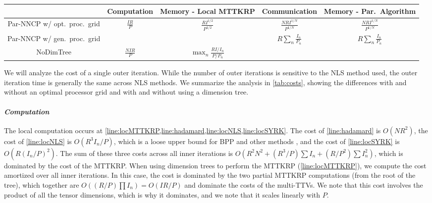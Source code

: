 \begin{table*}
\centering
\begin{tabular}{|c|cccc|}
\hline
 & \textbf{Computation} & \textbf{Memory - Local MTTKRP} & \textbf{Communication} & \textbf{Memory - Par.~Algorithm}  \\
\hline
Par-NNCP w/ opt.~proc.~grid & $\frac{IR}{P}$ & $\frac{RI^{1/2}}{P^{1/2}}$& $\frac{NRI^{1/N}}{P^{1/N}}$ & $\frac{NRI^{1/N}}{P^{1/N}}$  \\
Par-NNCP w/ gen.~proc.~grid & & & $R\sum_n \frac{I_n}{P_n}$ & $R\sum_n \frac{I_n}{P_n}$  \\
NoDimTree & $\frac{NIR}{P}$ & $\displaystyle \max_n \frac{RI/I_n}{P/P_n}$  &  & \\
\hline
\end{tabular}
\smallskip
\caption{Leading-order per-iteration costs in terms of computation (flops), communication (words moved), and memory (words).  We ignore constants but omit big-Oh notation for clarity.  The first line corresponds to \cref{alg:Par-NNCP-short} with an optimal choice of processor grid and applying the dimension tree optimization locally.  The second line corresponds to the changes in communication and memory for a general processor grid.  The third line corresponds to the changes in computation and memory if the dimension tree optimization is not applied.}
\label{tab:costs}
\end{table*}

We will analyze the cost of a single outer iteration.
While the number of outer iterations is sensitive to the NLS method used, the outer iteration time is generally the same across NLS methods.
We summarize the analysis in \cref{tab:costs}, showing the differences with and without an optimal processor grid and with and without using a dimension tree.

\paragraph{\emph{Computation}}
The local computation occurs at \cref{line:locMTTKRP,line:hadamard,line:locNLS,line:locSYRK}.
The cost of \cref{line:hadamard} is $O(NR^2)$, the cost of \cref{line:locNLS} is $O(R^3I_n/P)$, which is a loose upper bound for BPP and other methods \cite{KBP16}, and the cost of \cref{line:locSYRK} is $O(R(I_n/P)^2)$.
The sum of these three costs across all inner iterations is $O(R^2N^2+(R^3/P)\sum I_n+(R/P^2)\sum I_n^2)$, which is dominated by the cost of the MTTKRP.
When using dimension trees to perform the MTTKRP (\cref{line:locMTTKRP}), we compute the cost amortized over all inner iterations.
In this case, the cost is dominated by the two partial MTTKRP computations (from the root of the tree), which together are $O((R/P) \prod I_n)=O(IR/P)$ and dominate the costs of the multi-TTVs.
We note that this cost involves the product of all the tensor dimensions, which is why it dominates, and we note that it scales linearly with $P$.

